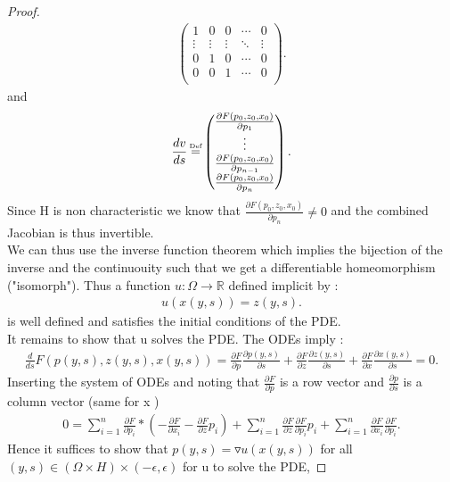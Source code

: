 \begin{proof}
\begin{align*}
\begin{pmatrix}
1 & 0 & 0 & \cdots & 0 \\
\vdots & \vdots & \vdots & \ddots & \vdots \\
0 & 1 & 0 & \cdots & 0 \\
0 & 0 & 1 & \cdots & 0 \\
\end{pmatrix}
  .\end{align*}
  and 
  \begin{align*}
    \frac{dv}{ds} \myS{Def}{=} \begin{pmatrix} \frac{\partial F(p_0,z_0,x_0)}{\partial p_1} \\ \vdots \\   \frac{\partial F(p_0,z_0,x_0)}{\partial p_{n-1}} \\  \frac{\partial F(p_0,z_0,x_0)}{\partial p_n} \end{pmatrix}
  .\end{align*}
  Since H is non characteristic we know that $ \frac{\partial F(p_0,z_0,x_0)}{\partial p_n} \neq 0$ and the combined Jacobian is thus invertible.\\[1ex]
  We can thus use the inverse function theorem which implies the bijection of the inverse and the continuouity  such that we get a differentiable homeomorphism ("isomorph").
  Thus a function $u : \Omega  \to  \mathbb{R}$ defined implicit by :
  \begin{align*}
    u(x(y,s)) = z(y,s) 
  .\end{align*}
is well defined and satisfies the initial conditions of the PDE.\\
It remains to show that u solves the PDE. The ODEs imply : 
\begin{align*}
  \frac{d}{ds} F(p(y,s),z(y,s),x(y,s)) = \frac{\partial F}{\partial p}\frac{\partial p(y,s)}{\partial s} +    \frac{\partial F}{\partial z}\frac{\partial z(y,s)}{\partial s} + \frac{\partial F}{\partial x}\frac{\partial x(y,s)}{\partial s} = 0
.\end{align*}
Inserting the system of ODEs and noting that $\frac{\partial F}{\partial p} $ is a row vector and $\frac{\partial p}{\partial s} $ is a column vector (same for x ) 
\begin{align*}
  0 = \sum_{i=1}^n \frac{\partial F}{\partial p_i}*(-\frac{\partial F}{\partial x_i}-\frac{\partial F}{\partial z}p_i) + \sum_{i=1}^n  \frac{\partial F}{\partial z}  \frac{\partial F}{\partial p_i}p_i + \sum_{i=1}^n \frac{\partial F}{\partial x_{i}}\frac{\partial F}{\partial p_i}   
.\end{align*}
Hence it suffices to show that $p(y,s) = \triangledown u(x(y,s))$ for all $(y,s) \in  (\Omega \times H) \times  (-\epsilon ,\epsilon )$ for u to solve the PDE,

\end{proof}
